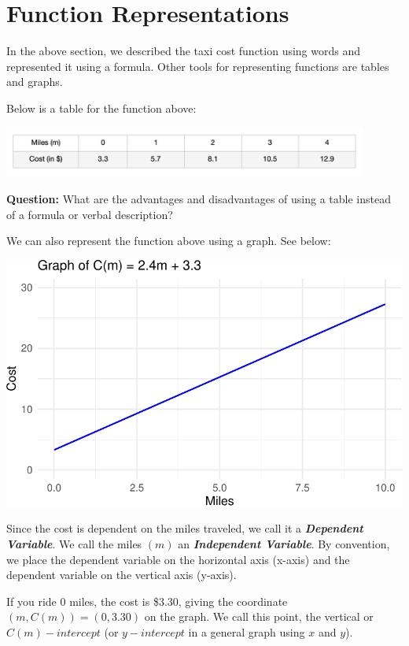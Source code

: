\documentclass[
  letterpaper,
  DIV=11,
  numbers=noendperiod]{scrreprt}
\begin{document}
\hypertarget{function-representations}{%
\section{Function Representations}\label{function-representations}}

In the above section, we described the taxi cost function using words
and represented it using a formula. Other tools for representing
functions are tables and graphs.

Below is a table for the function above:

\includegraphics[width=0.9\textwidth,height=\textheight]{images/i.jpeg}

\textbf{Question:} What are the advantages and disadvantages of using a
table instead of a formula or verbal description?

We can also represent the function above using a graph. See below:

\includegraphics{Intro_LF_files/figure-pdf/unnamed-chunk-1-1.pdf}

Since the cost is dependent on the miles traveled, we call it a
\textbf{\emph{Dependent Variable}}. We call the miles \((m)\) an
\textbf{\emph{Independent Variable}}. By convention, we place the
dependent variable on the horizontal axis (x-axis) and the dependent
variable on the vertical axis (y-axis).

If you ride 0 miles, the cost is \$3.30, giving the coordinate
\((m, C(m))=(0, 3.30)\) on the graph. We call this point, the vertical
or \(C(m)-intercept\) (or \(y-intercept\) in a general graph using \(x\)
and \(y\)).
\end{document}

